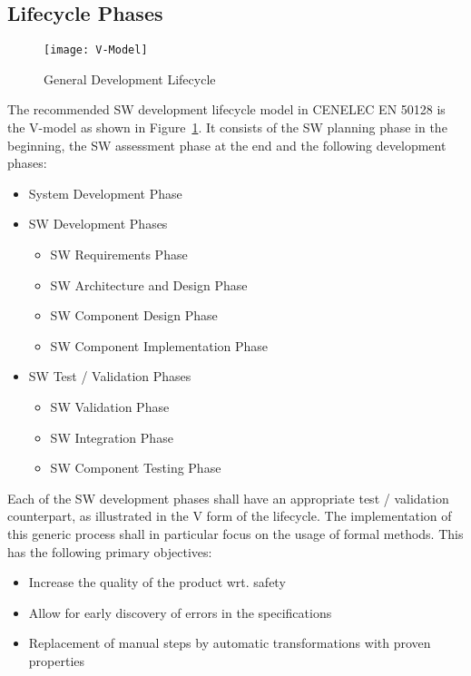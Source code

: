\subsection{Lifecycle Phases}
\label{sec:lifecycle-phases}

\begin{figure}[ht]
  \centering
  \texttt{[image: V-Model]}
  \caption{General Development Lifecycle~\cite{EN-50128}}
  \label{fig:develop-lifecycle-cenelec}
\end{figure}

The recommended SW development lifecycle model in CENELEC EN 50128 is the
V-model as shown in Figure~\ref{fig:develop-lifecycle-cenelec}. It consists of
the SW planning phase in the beginning, the SW assessment phase at the end and
the following development phases:

\begin{itemize}
\item System Development Phase
\item SW Development Phases
  \begin{itemize}
  \item SW Requirements Phase
  \item SW Architecture and Design Phase
  \item SW Component Design Phase
  \item SW Component Implementation Phase
  \end{itemize}
\item SW Test / Validation Phases
  \begin{itemize}
  \item SW Validation Phase
  \item SW Integration Phase
  \item SW Component Testing Phase
  \end{itemize}
\end{itemize}

Each of the SW development phases shall have an appropriate test / validation
counterpart, as illustrated in the V form of the lifecycle. The implementation
of this generic process shall in particular focus on the usage of formal
methods. This has the following primary objectives:

\begin{itemize}
\item Increase the quality of the product wrt. safety
\item Allow for early discovery of errors in the  specifications
\item Replacement of manual steps by automatic transformations with proven
  properties
\end{itemize}

